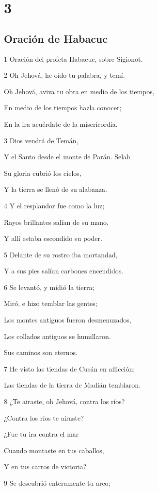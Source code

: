 \chapter{3}

\section*{Oración de Habacuc}

\par 1 Oración del profeta Habacuc, sobre Sigionot.
\par 2 Oh Jehová, he oído tu palabra, y temí.
\par Oh Jehová, aviva tu obra en medio de los tiempos,
\par En medio de los tiempos hazla conocer;
\par En la ira acuérdate de la misericordia.
\par 3 Dios vendrá de Temán,
\par Y el Santo desde el monte de Parán. Selah
\par Su gloria cubrió los cielos,
\par Y la tierra se llenó de su alabanza.
\par 4 Y el resplandor fue como la luz;
\par Rayos brillantes salían de su mano,
\par Y allí estaba escondido su poder.
\par 5 Delante de su rostro iba mortandad,
\par Y a sus pies salían carbones encendidos.
\par 6 Se levantó, y midió la tierra;
\par Miró, e hizo temblar las gentes;
\par Los montes antiguos fueron desmenuzados,
\par Los collados antiguos se humillaron.
\par Sus caminos son eternos.
\par 7 He visto las tiendas de Cusán en aflicción;
\par Las tiendas de la tierra de Madián temblaron.
\par 8 ¿Te airaste, oh Jehová, contra los ríos?
\par ¿Contra los ríos te airaste?
\par ¿Fue tu ira contra el mar
\par Cuando montaste en tus caballos,
\par Y en tus carros de victoria?
\par 9 Se descubrió enteramente tu arco;
